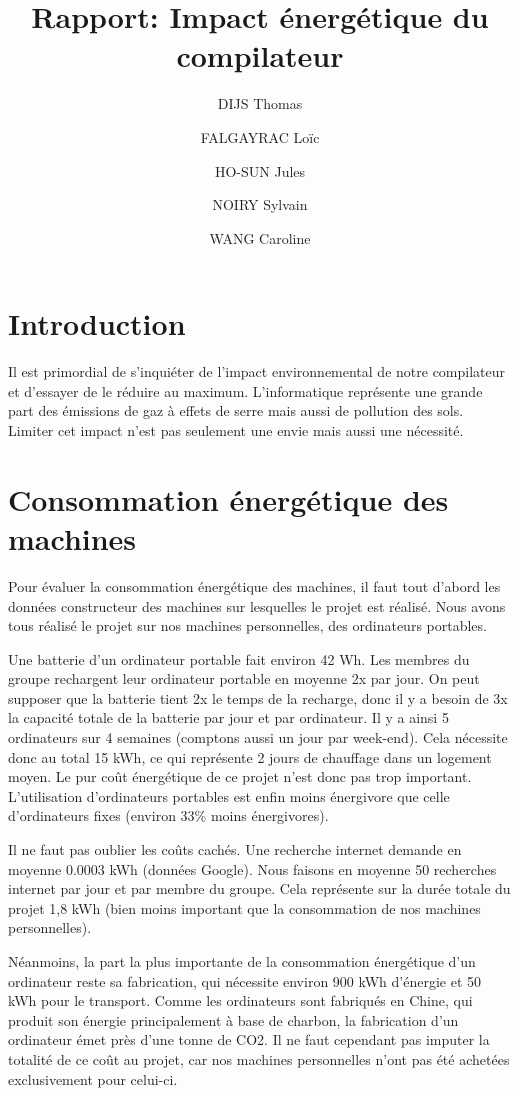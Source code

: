 \documentclass[12pt]{article}
\title{Rapport: Impact énergétique du compilateur}
\author{DIJS Thomas \and FALGAYRAC Loïc \and HO-SUN Jules \and NOIRY Sylvain \and WANG Caroline}
\begin{document}
\maketitle
\newpage
\tableofcontents
\newpage
\section{Introduction}
	Il est primordial de s'inquiéter de l'impact environnemental de notre compilateur et d'essayer de le réduire au maximum. L'informatique représente une grande part des émissions de gaz à effets de serre mais aussi de pollution des sols. Limiter cet impact n'est pas seulement une envie mais aussi une nécessité.
	
\section{Consommation énergétique des machines}

	Pour évaluer la consommation énergétique des machines, il faut tout d’abord les données constructeur des machines sur lesquelles le projet est réalisé. Nous avons tous réalisé le projet sur nos machines personnelles, des ordinateurs portables. 
	
	Une batterie d’un ordinateur portable fait environ 42 Wh. Les membres du groupe rechargent leur ordinateur portable en moyenne 2x par jour. On peut supposer que la batterie tient 2x le temps de la recharge, donc il y a besoin de 3x la capacité totale de la batterie par jour et par ordinateur. Il y a ainsi 5 ordinateurs sur 4 semaines (comptons aussi un jour par week-end). Cela nécessite donc au total 15 kWh, ce qui représente 2 jours de chauffage dans un logement moyen. Le pur coût énergétique de ce projet n’est donc pas trop important. L’utilisation d’ordinateurs portables est enfin moins énergivore que celle d’ordinateurs fixes (environ 33\% moins énergivores).
	
	Il ne faut pas oublier les coûts cachés. Une recherche internet demande en moyenne 0.0003 kWh (données Google). Nous faisons en moyenne 50 recherches internet par jour et par membre du groupe. Cela représente sur la durée totale du projet 1,8 kWh (bien moins important que la consommation de nos machines personnelles).
	
	Néanmoins, la part la plus importante de la consommation énergétique d’un ordinateur reste sa fabrication, qui nécessite environ 900 kWh d’énergie et 50 kWh pour le transport. Comme les ordinateurs sont fabriqués en Chine, qui produit son énergie principalement à base de charbon, la fabrication d’un ordinateur émet près d’une tonne de CO2. Il ne faut cependant pas imputer la totalité de ce coût au projet, car nos machines personnelles n’ont pas été achetées exclusivement pour celui-ci.
	
\end{document}
